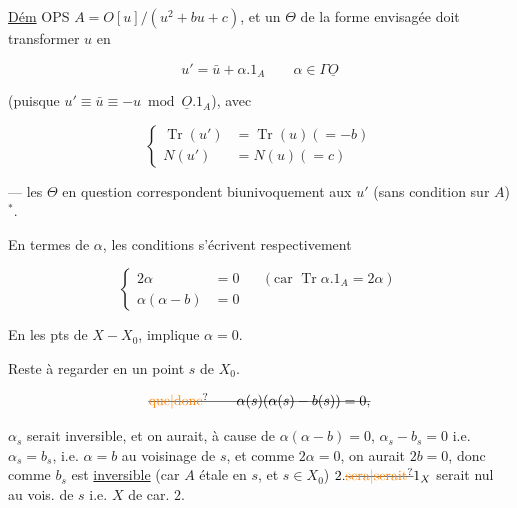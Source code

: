 

\uline{Dém} OPS $A=O[u]/(u^2+bu+c)$, et un  $\Theta$ de la forme envisagée doit transformer $u$ en 

\[
u'=\bar u+\alpha.1_A \qquad \alpha\in\Gamma\underline O
\]

(puisque $u'\equiv\bar u\equiv-u\bmod\underline O.1_A$), avec

\[
\left\{\begin{aligned}
\operatorname{Tr}(u')&=\operatorname{Tr}(u) (=-b)\\
N(u')&=N(u)(=c)
\end{aligned}\right.
\]

--- les $\Theta$ en question correspondent biunivoquement aux $u'$ (sans condition sur $A$)$^*$.


En termes de $\alpha$, les conditions s'écrivent respectivement

\[
\left\{\begin{aligned}
2\alpha&=0 &&(\text{car }\operatorname{Tr}\alpha.1_A=2\alpha)\\
\alpha(\alpha-b)&=0
\end{aligned}\right.
\]

En les pts de $X-X_0$,   implique $\alpha=0$.

Reste à regarder en un point $s$ de $X_0$.   

\[
\deleted{\unsure{\text{que}|\text{donc}}\qquad\alpha(s)(\alpha(s)-b(s))=0,}
\]

 $\alpha_s$ serait inversible, et on aurait, à cause de  $\alpha(\alpha-b)=0$, $\alpha_s-b_s=0$ i.e. $\alpha_s=b_s$,  i.e. $\alpha=b$ au voisinage de $s$,  et comme $2\alpha=0$, on aurait $2b=0$, donc comme $b_s$ est \uline{inversible} (car $A$ étale en $s$, et $s\in X_0$) $2.\deleted{\unsure{\text{sera}|\text{serait}}}1_{X}$ serait nul au vois. de $s$ i.e. $X$ de car. $2$.

